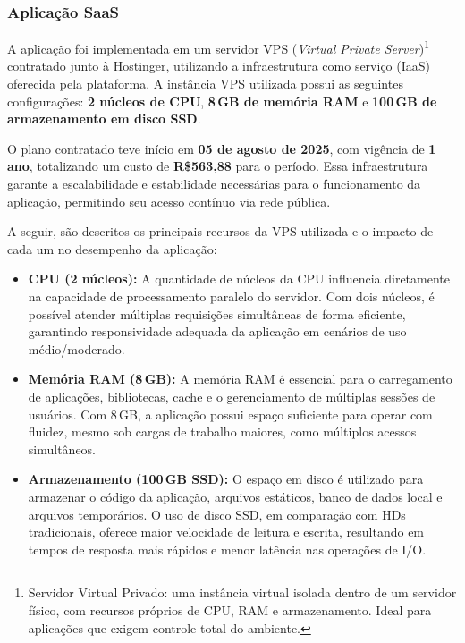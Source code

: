 \subsubsection{Aplicação SaaS}
\par A aplicação foi implementada em um servidor VPS (\textit{Virtual Private Server})\footnote{Servidor Virtual Privado: uma instância virtual isolada dentro de um servidor físico, com recursos próprios de CPU, RAM e armazenamento. Ideal para aplicações que exigem controle total do ambiente.} contratado junto à Hostinger, utilizando a infraestrutura como serviço (IaaS) oferecida pela plataforma. A instância VPS utilizada possui as seguintes configurações: \textbf{2 núcleos de CPU}, \textbf{8\,GB de memória RAM} e \textbf{100\,GB de armazenamento em disco SSD}.
\par O plano contratado teve início em \textbf{05 de agosto de 2025}, com vigência de \textbf{1 ano}, totalizando um custo de \textbf{R\$563,88} para o período. Essa infraestrutura garante a escalabilidade e estabilidade necessárias para o funcionamento da aplicação, permitindo seu acesso contínuo via rede pública.
\par A seguir, são descritos os principais recursos da VPS utilizada e o impacto de cada um no desempenho da aplicação:

\begin{itemize}
    \item \textbf{CPU (2 núcleos):} A quantidade de núcleos da CPU influencia diretamente na capacidade de processamento paralelo do servidor. Com dois núcleos, é possível atender múltiplas requisições simultâneas de forma eficiente, garantindo responsividade adequada da aplicação em cenários de uso médio/moderado.

    \item \textbf{Memória RAM (8\,GB):} A memória RAM é essencial para o carregamento de aplicações, bibliotecas, cache e o gerenciamento de múltiplas sessões de usuários. Com 8\,GB, a aplicação possui espaço suficiente para operar com fluidez, mesmo sob cargas de trabalho maiores, como múltiplos acessos simultâneos.

    \item \textbf{Armazenamento (100\,GB SSD):} O espaço em disco é utilizado para armazenar o código da aplicação, arquivos estáticos, banco de dados local e arquivos temporários. O uso de disco SSD, em comparação com HDs tradicionais, oferece maior velocidade de leitura e escrita, resultando em tempos de resposta mais rápidos e menor latência nas operações de I/O.
\end{itemize}


